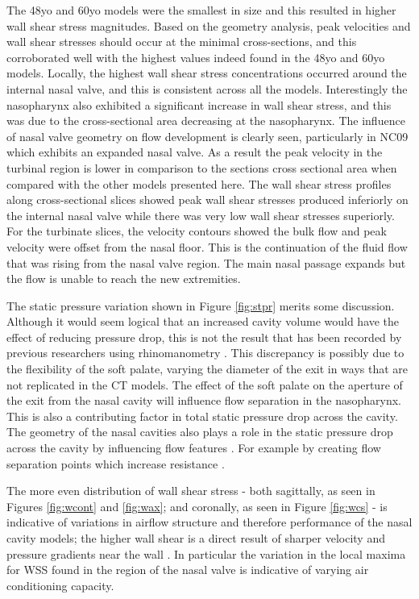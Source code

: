 The 48yo and 60yo models were the smallest in size and this resulted in higher wall shear stress magnitudes. Based on the geometry analysis, peak velocities and wall shear stresses should occur at the minimal cross-sections, and this corroborated well with the highest values indeed found in the 48yo and 60yo models. Locally, the highest wall shear stress concentrations occurred around the internal nasal valve, and this is consistent across all the models. Interestingly the nasopharynx also exhibited a significant increase in wall shear stress, and this was due to the cross-sectional area decreasing at the nasopharynx.
The influence of nasal valve geometry on flow development is clearly seen, particularly in NC09 which exhibits an expanded nasal valve. As a result the peak velocity in the turbinal region is lower in comparison to the sections cross sectional area when compared with the other models presented here.
The wall shear stress profiles along cross-sectional slices showed peak wall shear stresses produced inferiorly on the internal nasal valve while there was very low wall shear stresses superiorly. For the turbinate slices, the velocity contours showed the bulk flow and peak velocity were offset from the nasal floor. This is the continuation of the fluid flow that was rising from the nasal valve region. The main nasal passage expands but the flow is unable to reach the new extremities.

The static pressure variation shown in Figure \ref{fig:stpr} merits some discussion. 
Although it would seem logical that an increased cavity volume would have the effect of reducing pressure drop, this is not the result that has been recorded by previous researchers using rhinomanometry \cite{Lindemann2008}.
This discrepancy is possibly due to the flexibility of the soft palate, varying the diameter of the exit in ways that are not replicated in the CT models.
The effect of the soft palate on the aperture of the exit from the nasal cavity will influence flow separation in the nasopharynx. This is also a contributing factor in total static pressure drop across the cavity.
The geometry of the nasal cavities also plays a role in the static pressure drop across the cavity by influencing flow features \cite{Ramprasad2016}. For example by creating flow separation points which increase resistance \cite{Ramprasad2016}.

The more even distribution of wall shear stress - both sagittally, as seen in Figures \ref{fig:wcont} and \ref{fig:wax}; and coronally, as seen in Figure \ref{fig:wcs} - is indicative of variations in airflow structure and therefore performance of the nasal cavity models; the higher wall shear is a direct result of sharper velocity and pressure gradients near the wall \cite{Inthavong2014c}. In particular the variation in the local maxima for WSS found in the region of the nasal valve is indicative of varying air conditioning capacity.

